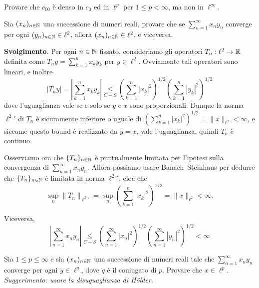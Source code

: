 \begin{exercise}
\label{ex:c00_density}
	Provare che $c_{00}$ è denso in $c_0$ ed in $\ell^p$ per $1 \leq p < \infty$, ma non in $\ell^\infty$.
\end{exercise}
\begin{exercise}
	Sia $(x_n)_{n \in \mathbb{N}}$ una successione di numeri reali, provare che se $\sum_{n=1}^\infty x_n y_n$ converge per ogni $(y_n)_{n \in \mathbb{N}} \in \ell^2$, allora $(x_n)_{n \in \mathbb{N}} \in \ell^2$, e viceversa.

	\textbf{Svolgimento}. Per ogni $n \in \mathbb{N}$ fissato, consideriamo gli operatori $T_n : \ell^2 \to \mathbb{R}$ definita come $T_ny = \sum_{k=1}^n x_ky_k$ per $y \in \ell^2$. Ovviamente tali operatori sono lineari, e inoltre
	\begin{equation*}
		|T_ny| = \left| \sum_{k=1}^n x_k y_k \right| \underset{C-S}\leq \left( \sum_{k=1}^n |x_k|^2\right)^{1/2}\! \left( \sum_{k=1}^n |y_k|^2 \right)^{1/2}
	\end{equation*}
	dove l'uguaglianza vale se e solo se $y$ e $x$ sono proporzionali. Dunque la norma ${\ell^2}'$ di $T_n$ è sicuramente inferiore o uguale di $\left( \sum_{k=1}^n |x_k|^2\right)^{1/2} = \|x\|_{\ell^2} < \infty$, e siccome questo bound è realizzato da $y=x$, vale l'uguaglianza, quindi $T_n$ è continuo.

	Osserviamo ora che $\{T_n\}_{n \in \mathbb{N}}$ è puntualmente limitata per l'ipotesi sulla convergenza di $\sum_{n=1}^\infty x_n y_n$. Allora possiamo usare Banach--Steinhaus per dedurre che $\{T_n\}_{n \in \mathbb{N}}$ è limitata in norma ${\ell^2}'$, cioè che
	\begin{equation*}
		\sup_n \|T_n\|_{{\ell^2}'} = \sup_n \left( \sum_{k=1}^n |x_k|^2 \right)^{1/2} = \|x\|_{\ell^2} < \infty.
	\end{equation*}

	Viceversa,
	\begin{equation*}
		\left| \sum_{n=1}^\infty x_n y_n \right| \underset{C-S}\leq \left( \sum_{n=1}^\infty |x_n|^2\right)^{1/2}\! \left( \sum_{n=1}^\infty |y_n|^2 \right)^{1/2} < \infty
	\end{equation*}
\end{exercise}

\begin{exercise}
	Sia $1 \leq p \leq \infty$ e sia $(x_n)_{n \in \mathbb{N}}$ una successione di numeri reali tale che $\sum_{n=1}^\infty x_ny_n$ converge per ogni $y \in \ell^q$, dove $q$ è il coniugato di $p$. Provare che $x \in \ell^p$. \emph{Suggerimento: usare la disuguaglianza di H\"older.}
\end{exercise}

